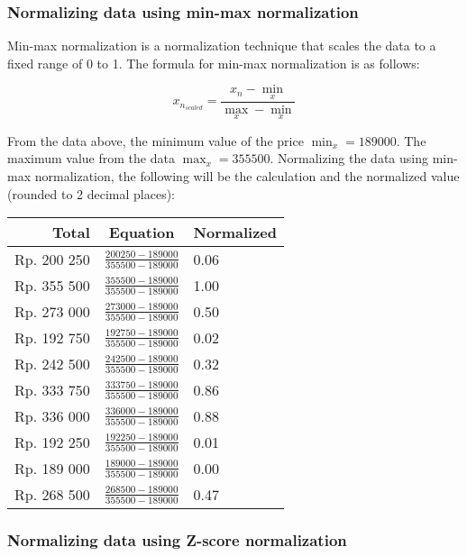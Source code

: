 \documentclass[
  11pt, %
]{assignment}
\begin{document}
\medskip

\subsubsection*{Normalizing data using min-max normalization}

Min-max normalization is a normalization technique that scales the data to a fixed range of 0 to 1. The formula for min-max normalization is as follows:

\[ x_{n_{scaled}} = \frac{x_n - \min_x}{\max_x - \min_x} \]

From the data above, the minimum value of the price \(\min_x = 189 000\). The maximum value from the data \(\max_x = 355 500\). Normalizing the data using min-max normalization, the following will be the calculation and the normalized value (rounded to 2 decimal places):

\begin{center}
	\begin{tabular}{r | c | l}
		Total       & Equation                                    & Normalized \\
		\toprule
		Rp. 200 250 & \(\frac{200250 - 189000}{355500 - 189000}\) & 0.06       \\[4pt]
		Rp. 355 500 & \(\frac{355500 - 189000}{355500 - 189000}\) & 1.00       \\[4pt]
		Rp. 273 000 & \(\frac{273000 - 189000}{355500 - 189000}\) & 0.50       \\[4pt]
		Rp. 192 750 & \(\frac{192750 - 189000}{355500 - 189000}\) & 0.02       \\[4pt]
		Rp. 242 500 & \(\frac{242500 - 189000}{355500 - 189000}\) & 0.32       \\[4pt]
		Rp. 333 750 & \(\frac{333750 - 189000}{355500 - 189000}\) & 0.86       \\[4pt]
		Rp. 336 000 & \(\frac{336000 - 189000}{355500 - 189000}\) & 0.88       \\[4pt]
		Rp. 192 250 & \(\frac{192250 - 189000}{355500 - 189000}\) & 0.01       \\[4pt]
		Rp. 189 000 & \(\frac{189000 - 189000}{355500 - 189000}\) & 0.00       \\[4pt]
		Rp. 268 500 & \(\frac{268500 - 189000}{355500 - 189000}\) & 0.47       \\
		\bottomrule
	\end{tabular}
\end{center}

\subsubsection*{Normalizing data using Z-score normalization}
\end{document}
